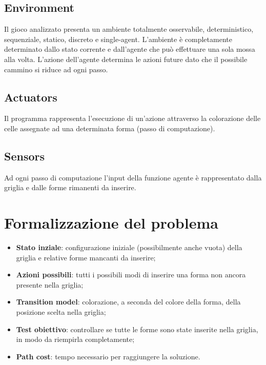 \subsection{Environment}
Il gioco analizzato presenta un ambiente totalmente osservabile, deterministico, sequenziale, statico, discreto e single-agent.  L'ambiente è completamente determinato dallo stato corrente e dall'agente che può effettuare una sola mossa alla volta.
L'azione dell'agente determina le azioni future dato che il possibile cammino si riduce ad ogni passo.

\subsection{Actuators}
Il programma rappresenta l'esecuzione di un'azione attraverso la colorazione delle celle assegnate ad una determinata forma (passo di computazione).

\subsection{Sensors}
Ad ogni passo di computazione l'input della funzione agente è rappresentato dalla griglia e dalle forme rimanenti da inserire.

\section{Formalizzazione del problema}
\begin{itemize}
	\item \textbf{Stato inziale}: configurazione iniziale (possibilmente anche vuota) della griglia e relative forme mancanti da inserire;
	\item \textbf{Azioni possibili}: tutti i possibili modi di inserire una forma non ancora presente nella griglia;
	\item \textbf{Transition model}: colorazione, a seconda del colore della forma, della posizione scelta nella griglia;
	\item \textbf{Test obiettivo}: controllare se tutte le forme sono state inserite nella griglia, in modo da riempirla completamente;
	\item \textbf{Path cost}: tempo necessario per raggiungere la soluzione.
					
\end{itemize}

